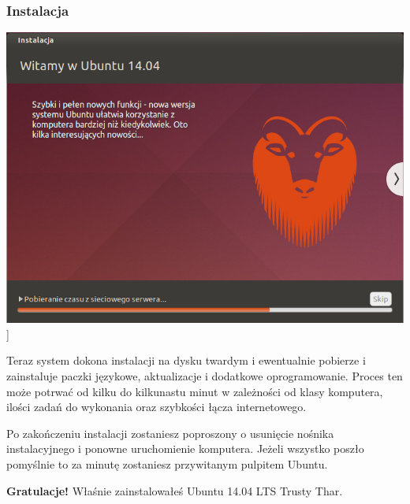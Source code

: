 \subsubsection{Instalacja}
\begin{center}
	\includegraphics[scale=0.5]{images/instalator_kopiowanie.png}]
\end{center}
Teraz system dokona instalacji na dysku twardym i ewentualnie pobierze i zainstaluje paczki językowe, aktualizacje i dodatkowe oprogramowanie. Proces ten może potrwać od kilku do kilkunastu minut w zależności od klasy komputera, ilości zadań do wykonania oraz szybkości łącza internetowego.

Po zakończeniu instalacji zostaniesz poproszony o usunięcie nośnika instalacyjnego i ponowne uruchomienie komputera. Jeżeli wszystko poszło pomyślnie to za minutę zostaniesz przywitanym pulpitem Ubuntu.

\begin{flushright}
\textbf{Gratulacje!} Właśnie zainstalowałeś Ubuntu 14.04 LTS Trusty Thar.
\end{flushright}
\clearpage